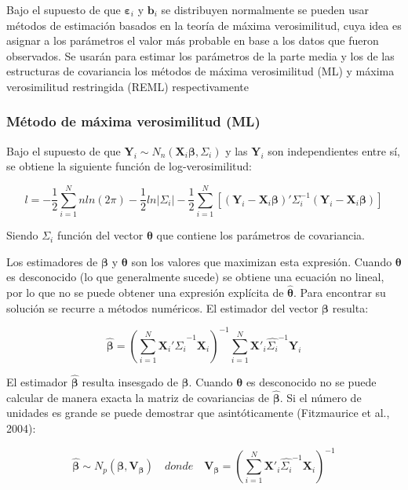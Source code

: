 \documentclass[spanish]{article}
\numberwithin{figure}{subsection}
\numberwithin{equation}{subsection}
\numberwithin{table}{subsection}
\begin{document}
Bajo el supuesto de que $\bm{\varepsilon}_i$ y $\bm{b}_i$ se distribuyen normalmente se
pueden usar métodos de estimación basados en la teoría de máxima verosimilitud,
cuya idea es asignar a los parámetros el valor más probable en base a los datos
que fueron observados. Se usarán para estimar los parámetros de la parte media
y los de las estructuras de covariancia los métodos de máxima verosimilitud
(ML) y máxima verosimilitud restringida (REML) respectivamente

\subsubsection{Método de máxima verosimilitud (ML)}

Bajo el supuesto de que $\bm{Y}_i \sim N_n(\bm{X}_i \bm{\beta},
\bm{\varSigma}_i)$ y las $\bm{Y}_i$
son independientes entre sí, se obtiene la siguiente función de
log-verosimilitud:

\begin{equation}
\label{ML}
	l = -\frac{1}{2} \sum_{i=1}^{N}n ln(2\pi) - \frac{1}{2}ln|\bm{\varSigma}_i| -
	\frac{1}{2} \sum_{i=1}^{N} [(\bm{Y}_i - \bm{X}_i\bm{\beta})'
	\bm{\varSigma}_i^{-1} (\bm{Y}_i - \bm{X}_i\bm{\beta})]
\end{equation}

Siendo $\bm{\varSigma}_i$ función del vector $\bm{\theta}$ que contiene los
parámetros de covariancia.

Los estimadores de $\bm{\beta}$ y $\bm{\theta}$ son los valores que maximizan
esta expresión. Cuando $\bm{\theta}$ es desconocido (lo que generalmente sucede)
se obtiene una ecuación no lineal, por lo que no se puede obtener una expresión
explícita de $\hat{\bm{\theta}}$. Para encontrar su solución se recurre a
métodos numéricos. El estimador del vector $\bm{\beta}$ resulta:

\[ \hat{\bm{\beta}} = (\sum_{i=1}^{N} \bm{X}_i'\hat{\bm{\varSigma}_i}^{-1}\bm{X}_i)^{-1}
\sum_{i=1}^{N} \bm{X}'_i\hat{\bm{\varSigma}_i}^{-1}\bm{Y}_i \]

El estimador $\hat{\bm{\beta}}$ resulta insesgado de $\bm{\beta}$. Cuando
$\bm{\theta}$ es desconocido no se puede calcular de manera exacta la matriz
de covariancias de $\hat{\bm{\beta}}$. Si el número de unidades es grande se
puede demostrar que asintóticamente (Fitzmaurice et al., 2004):

\[ \hat{\bm{\beta}} \sim N_p(\bm{\beta}, \bm{V}_{\bm{\beta}}) \quad donde \quad \bm{V}_{\bm{\beta}} =
(\sum_{i=1}^{N} \bm{X}'_i\hat{\bm{\varSigma}_i}^{-1}\bm{X}_i)^{-1} \]
\end{document}
